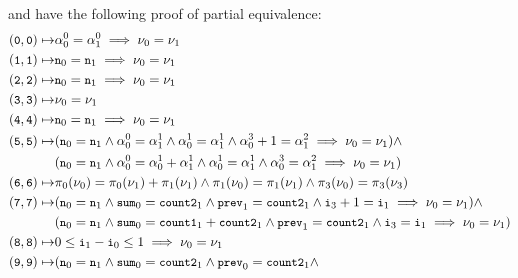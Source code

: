 %
 and  have the following proof of
partial equivalence:
%
%
\begin{align*}
  (\cc{0}, \cc{0}) \mapsto & %
  \alpha_0^0 = \alpha_1^0 \implies \nu_0 = \nu_1 \\
  (\cc{1}, \cc{1}) \mapsto & %
  \cc{n}_0 = \cc{n}_1 \implies \nu_0 = \nu_1 \\
  (\cc{2}, \cc{2}) \mapsto & %
  \cc{n}_0 = \cc{n}_1 \implies \nu_0 = \nu_1 \\
  (\cc{3}, \cc{3}) \mapsto & \nu_0 = \nu_1 \\
  (\cc{4}, \cc{4}) \mapsto & %
  \cc{n}_0 = \cc{n}_1 \implies \nu_0 = \nu_1 \\
  (\cc{5}, \cc{5}) \mapsto & %
  (\cc{n}_0 = \cc{n}_1 \land %
  \alpha_0^0 = \alpha_1^1 \land %
  \alpha_0^1 = \alpha_1^1 \land %
  \alpha_0^3 + 1 = \alpha_1^2 \implies %
  \nu_0 = \nu_1) \land \\
  & (\cc{n}_0 = \cc{n}_1 \land %
  \alpha_0^0 = \alpha_0^1 + \alpha_1^1 \land %
  \alpha_0^1 = \alpha_1^1 \land %
  \alpha_0^3 = \alpha_1^2 \implies %
  \nu_0 = \nu_1) \\
  (\cc{6}, \cc{6}) \mapsto & %
  \pi_0(\nu_0) = \pi_0(\nu_1) + \pi_1(\nu_1) \land %
  \pi_1(\nu_0) = \pi_1(\nu_1) \land %
  \pi_3(\nu_0) = \pi_3(\nu_3) \\
  (\cc{7}, \cc{7}) \mapsto & 
  (\cc{n}_0 = \cc{n}_1 \land %
  \cc{sum}_0 = \cc{count2}_1 \land %
  \cc{prev}_1 = \cc{count2}_1 \land %
  \cc{i}_3 + 1 = \cc{i}_1 \implies %
  \nu_0 = \nu_1) \land \\
  & (\cc{n}_0 = \cc{n}_1 \land %
  \cc{sum}_0 = \cc{count1}_1 + \cc{count2}_1 \land %
  \cc{prev}_1 = \cc{count2}_1 \land %
  \cc{i}_3 = \cc{i}_1 \implies %
  \nu_0 = \nu_1) \\
  (\cc{8}, \cc{8}) \mapsto & 0 \leq \cc{i}_1 - \cc{i}_0 \leq 1 \implies %
  \nu_0 = \nu_1 \\
  (\cc{9}, \cc{9}) \mapsto & 
  (\cc{n}_0 = \cc{n}_1 \land %
  \cc{sum}_0 = \cc{count2}_1 \land %
  \cc{prev}_0 = \cc{count2}_1 \land %

\end{align*}
